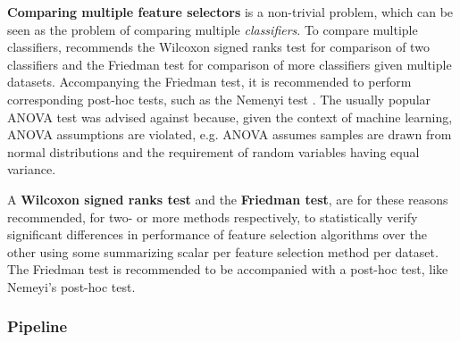 \documentclass{article}
\begin{document}
\textbf{Comparing multiple feature selectors} is a non-trivial problem, which can be seen as the problem of comparing multiple \textit{classifiers}. To compare multiple classifiers, \citep{demvsar2006statistical} recommends the Wilcoxon signed ranks test for comparison of two classifiers and the Friedman test for comparison of more classifiers given multiple datasets. Accompanying the Friedman test, it is recommended to perform corresponding post-hoc tests, such as the Nemenyi test \citep{nemenyi1963distribution}. The usually popular ANOVA test was advised against because, given the context of machine learning, ANOVA assumptions are violated, e.g. ANOVA assumes samples are drawn from normal distributions and the requirement of random variables having equal variance.

A \textbf{Wilcoxon signed ranks test} and the \textbf{Friedman test}, are for these reasons recommended, for two- or more methods respectively, to statistically verify significant differences in performance of feature selection algorithms over the other using some summarizing scalar per feature selection method per dataset. The Friedman test is recommended to be accompanied with a post-hoc test, like Nemeyi's post-hoc test.




\subsubsection{Pipeline}
\end{document}
